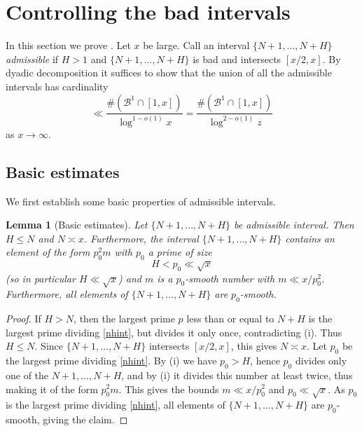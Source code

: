 \documentclass[12pt]{amsart}
\newtheorem{lemma}[theorem]{Lemma}
\begin{document}
\section{Controlling the bad intervals}\label{main-sec}

In this section we prove . Let $x$ be large.  Call an interval $\{N+1,\dots,N+H\}$ \emph{admissible} if $H > 1$ and $\{N+1,\dots,N+H\}$ is bad and intersects $[x/2,x]$.  By dyadic decomposition it suffices to show that the union of all the admissible intervals has cardinality
\begin{equation}\label{bond}
 \ll \frac{\#({\mathcal B}^1 \cap [1,x])}{\log^{1-o(1)} x} =  \frac{\#({\mathcal B}^1 \cap [1,x])}{\log^{2-o(1)} z}
\end{equation}
as $x \to \infty$.

\subsection{Basic estimates}

We first establish some basic properties of admissible intervals.

\begin{lemma}[Basic estimates]\label{lem-basic}  Let $\{N+1,\dots,N+H\}$ be admissible interval. Then $H \leq N$ and $N \asymp x$.  Furthermore, the interval $\{N+1,\dots,N+H\}$ contains an element of the form $p_0^2 m$ with $p_0$ a prime of size
$$ H < p_0 \ll \sqrt{x}$$
(so in particular $H \ll \sqrt{x}$) and $m$ is a $p_0$-smooth number with $m \ll x / p_0^2$.  Furthermore, all elements of $\{N+1,\dots,N+H\}$ are $p_0$-smooth.
\end{lemma}

\begin{proof} If $H > N$, then the largest prime $p$ less than or equal to $N+H$ is the largest prime dividing \eqref{nhint}, but divides it only once, contradicting (i).  Thus $H \leq N$.  Since $\{N+1,\dots,N+H\}$ intersects $[x/2,x]$, this gives $N \asymp x$.
Let $p_0$ be the largest prime dividing \eqref{nhint}.  By (i) we have $p_0 > H$, hence $p_0$ divides only one of the $N+1,\dots,N+H$, and by (i) it divides this number at least twice, thus making it of the form $p_0^2 m$.  This gives the bounds $m \ll x/p_0^2$ and $p_0 \ll \sqrt{x}$.  As $p_0$ is the largest prime dividing \eqref{nhint}, all elements of $\{N+1,\dots,N+H\}$ are $p_0$-smooth, giving the claim.
\end{proof}
\end{document}
